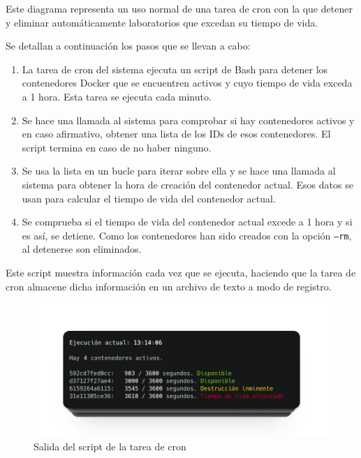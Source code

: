             Este diagrama representa un uso normal de una tarea de cron con la que detener y eliminar automáticamente laboratorios que excedan su tiempo de vida.

            Se detallan a continuación los pasos que se llevan a cabo:

            \begin{enumerate}
                \item La tarea de cron del sistema ejecuta un script de Bash para detener los contenedores Docker que se encuentren activos y cuyo tiempo de vida exceda a 1 hora. Esta tarea se ejecuta cada minuto.

                \item Se hace una llamada al sistema para comprobar si hay contenedores activos y en caso afirmativo, obtener una lista de los IDs de esos contenedores. El script termina en caso de no haber ninguno.

                \item Se usa la lista en un bucle para iterar sobre ella y se hace una llamada al sistema para obtener la hora de creación del contenedor actual. Esos datos se usan para calcular el tiempo de vida del contenedor actual.
                
                \item Se comprueba si el tiempo de vida del contenedor actual excede a 1 hora y si es así, se detiene. Como los contenedores han sido creados con la opción \texttt{--rm}, al detenerse son eliminados.
            \end{enumerate}

            Este script muestra información cada vez que se ejecuta, haciendo que la tarea de cron almacene dicha información en un archivo de texto a modo de registro.

            \begin{figure}[htbp]
                \centering

                \includegraphics[scale=0.3]{images/Capturas/cron-log.png}

                \caption{Salida del script de la tarea de cron}
                \label{fig:detener-cron-log}
            \end{figure}

